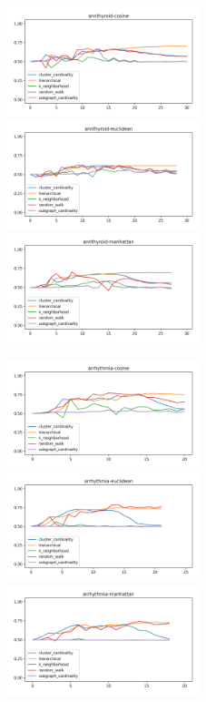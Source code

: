 \begin{figure}[!t]
\centering
\includegraphics[width=2.2in]{kdd/static/auc_vs_depth/annthyroid-cosine.png}
\includegraphics[width=2.2in]{kdd/static/auc_vs_depth/annthyroid-euclidean.png}
\includegraphics[width=2.2in]{kdd/static/auc_vs_depth/annthyroid-manhattan.png}

\includegraphics[width=2.2in]{kdd/static/auc_vs_depth/arrhythmia-cosine.png}
\includegraphics[width=2.2in]{kdd/static/auc_vs_depth/arrhythmia-euclidean.png}
\includegraphics[width=2.2in]{kdd/static/auc_vs_depth/arrhythmia-manhattan.png}


\end{figure}

